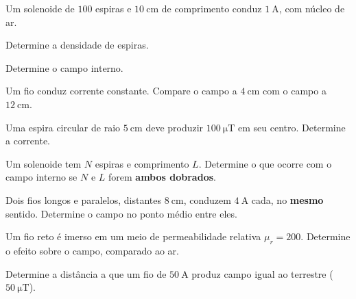\blocoaplicacao
\begin{questao}[2]{}

Um solenoide de $100$ espiras e $\SI{10}{\centi\meter}$ de comprimento conduz
$\SI{1}{\ampere}$, com núcleo de ar.
\begin{itensq}
\item Determine a densidade de espiras.
\item Determine o campo interno.
\end{itensq}


\end{questao}
\begin{questao}[2]{}

Um fio conduz corrente constante. Compare o campo a $\SI{4}{\centi\meter}$ com
o campo a $\SI{12}{\centi\meter}$.


\end{questao}
\begin{questao}[2]{}

Uma espira circular de raio $\SI{5}{\centi\meter}$ deve produzir
$\SI{100}{\micro\tesla}$ em seu centro. Determine a corrente.


\end{questao}
\begin{questao}[2]{}

Um solenoide tem $N$ espiras e comprimento $L$. Determine o que ocorre com o
campo interno se $N$ e $L$ forem \textbf{ambos dobrados}.


\end{questao}
\begin{questao}[2]{}

Dois fios longos e paralelos, distantes $\SI{8}{\centi\meter}$, conduzem
$\SI{4}{\ampere}$ cada, no \textbf{mesmo} sentido. Determine o campo no ponto
médio entre eles.


\end{questao}
\begin{questao}[2]{}

Um fio reto é imerso em um meio de permeabilidade relativa $\mu_r=200$.
Determine o efeito sobre o campo, comparado ao ar.


\end{questao}
\begin{questao}[2]{}

Determine a distância a que um fio de $\SI{50}{\ampere}$ produz campo igual ao
terrestre ($\SI{50}{\micro\tesla}$).


\end{questao}
